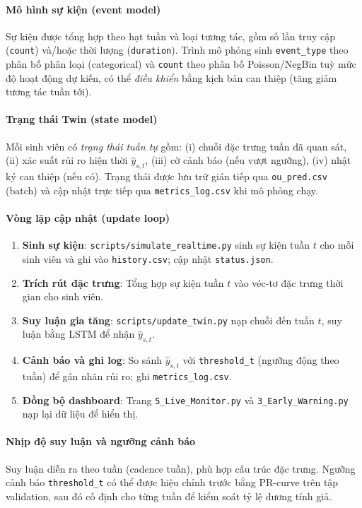 \documentclass[12pt,a4paper]{article}
\begin{document}
\paragraph{Mô hình sự kiện (event model)}
Sự kiện được tổng hợp theo hạt tuần và loại tương tác, gồm số lần truy cập (\texttt{count}) và/hoặc thời lượng (\texttt{duration}). Trình mô phỏng sinh \texttt{event\_type} theo phân bố phân loại (categorical) và \texttt{count} theo phân bố Poisson/NegBin tuỳ mức độ hoạt động dự kiến, có thể \emph{điều khiển} bằng kịch bản can thiệp (tăng giảm tương tác tuần tới).

\paragraph{Trạng thái Twin (state model)}
Mỗi sinh viên có \emph{trạng thái tuần tự} gồm: (i) chuỗi đặc trưng tuần đã quan sát, (ii) xác suất rủi ro hiện thời $\hat{y}_{s,t}$, (iii) cờ cảnh báo (nếu vượt ngưỡng), (iv) nhật ký can thiệp (nếu có). Trạng thái được lưu trữ gián tiếp qua \texttt{ou\_pred.csv} (batch) và cập nhật trực tiếp qua \texttt{metrics\_log.csv} khi mô phỏng chạy.

\paragraph{Vòng lặp cập nhật (update loop)}
\begin{enumerate}
    \item \textbf{Sinh sự kiện}: \texttt{scripts/simulate\_realtime.py} sinh sự kiện tuần $t$ cho mỗi sinh viên và ghi vào \texttt{history.csv}; cập nhật \texttt{status.json}.
    \item \textbf{Trích rút đặc trưng}: Tổng hợp sự kiện tuần $t$ vào véc-tơ đặc trưng thời gian cho sinh viên.
    \item \textbf{Suy luận gia tăng}: \texttt{scripts/update\_twin.py} nạp chuỗi đến tuần $t$, suy luận bằng LSTM để nhận $\hat{y}_{s,t}$.
    \item \textbf{Cảnh báo và ghi log}: So sánh $\hat{y}_{s,t}$ với \texttt{threshold\_t} (ngưỡng động theo tuần) để gán nhãn rủi ro; ghi \texttt{metrics\_log.csv}.
    \item \textbf{Đồng bộ dashboard}: Trang \texttt{5\_Live\_Monitor.py} và \texttt{3\_Early\_Warning.py} nạp lại dữ liệu để hiển thị.
\end{enumerate}

\paragraph{Nhịp độ suy luận và ngưỡng cảnh báo}
Suy luận diễn ra theo tuần (cadence tuần), phù hợp cấu trúc đặc trưng. Ngưỡng cảnh báo \texttt{threshold\_t} có thể được hiệu chỉnh trước bằng PR-curve trên tập validation, sau đó cố định cho từng tuần để kiểm soát tỷ lệ dương tính giả.
\end{document}
